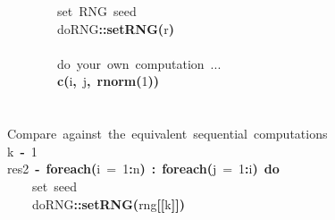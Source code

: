 \documentclass[a4paper,12pt]{article}\usepackage{graphicx, color}
\makeatletter
\newcommand{\hlnumber}[1]{\textcolor[rgb]{0,0,0}{#1}}%
\newcommand{\hlfunctioncall}[1]{\textcolor[rgb]{0.501960784313725,0,0.329411764705882}{\textbf{#1}}}%
\newcommand{\hlkeyword}[1]{\textcolor[rgb]{0,0,0}{\textbf{#1}}}%
\newcommand{\hlargument}[1]{\textcolor[rgb]{0.690196078431373,0.250980392156863,0.0196078431372549}{#1}}%
\newcommand{\hlcomment}[1]{\textcolor[rgb]{0.180392156862745,0.6,0.341176470588235}{#1}}%
\newcommand{\hlassignement}[1]{\textcolor[rgb]{0,0,0}{\textbf{#1}}}%
\newcommand{\hlpackage}[1]{\textcolor[rgb]{0.588235294117647,0.709803921568627,0.145098039215686}{#1}}%
\newcommand{\hlsymbol}[1]{\textcolor[rgb]{0,0,0}{#1}}%
\newcommand{\hlstd}[1]{\textcolor[rgb]{0,0,0}{#1}}%
\newenvironment{kframe}{%
 \def\FrameCommand##1{\hskip\@totalleftmargin \hskip-\fboxsep
 \colorbox{shadecolor}{##1}\hskip-\fboxsep
     \hskip-\linewidth \hskip-\@totalleftmargin \hskip\columnwidth}%
 \MakeFramed {\advance\hsize-\width
   \@totalleftmargin\z@ \linewidth\hsize
   \@setminipage}}%
 {\par\unskip\endMakeFramed}
\newenvironment{knitrout}{}{} %
\renewenvironment{knitrout}{\begin{footnotesize}}{\end{footnotesize}}
\makeatother
\begin{document}
\begin{knitrout}
\begin{kframe}
\begin{flushleft}
\hlstd{}{\ }{\ }{\ }{\ }{\ }{\ }{\ }{\ }\hlcomment{\usebox{\hlnormalsizeboxhash}{\ }set{\ }RNG{\ }seed}\hspace*{\fill}\\
\hlstd{}{\ }{\ }{\ }{\ }{\ }{\ }{\ }{\ }\hlpackage{doRNG}\hlkeyword{::}\hlfunctioncall{setRNG}\hlkeyword{(}\hlsymbol{r}\hlkeyword{)}\hspace*{\fill}\\
\hlstd{}\hspace*{\fill}\\
\hlstd{}{\ }{\ }{\ }{\ }{\ }{\ }{\ }{\ }\hlcomment{\usebox{\hlnormalsizeboxhash}{\ }do{\ }your{\ }own{\ }computation{\ }...}\hspace*{\fill}\\
\hlstd{}{\ }{\ }{\ }{\ }{\ }{\ }{\ }{\ }\hlfunctioncall{c}\hlkeyword{(}\hlsymbol{i}\hlkeyword{,}{\ }\hlsymbol{j}\hlkeyword{,}{\ }\hlfunctioncall{rnorm}\hlkeyword{(}\hlnumber{1}\hlkeyword{)}\hlkeyword{)}\hspace*{\fill}\\
\hlstd{}{\ }{\ }{\ }{\ }\hlkeyword{\usebox{\hlnormalsizeboxclosebrace}}\hspace*{\fill}\\
\hlstd{}\hspace*{\fill}\\
\hlstd{}\hlcomment{\usebox{\hlnormalsizeboxhash}{\ }Compare{\ }against{\ }the{\ }equivalent{\ }sequential{\ }computations}\hspace*{\fill}\\
\hlstd{}\hlsymbol{k}{\ }\hlassignement{\usebox{\hlnormalsizeboxlessthan}-}{\ }\hlnumber{1}\hspace*{\fill}\\
\hlstd{}\hlsymbol{res2}{\ }\hlassignement{\usebox{\hlnormalsizeboxlessthan}-}{\ }\hlfunctioncall{foreach}\hlkeyword{(}\hlargument{i}{\ }\hlargument{=}{\ }\hlnumber{1}\hlkeyword{:}\hlsymbol{n}\hlkeyword{)}{\ }\hlkeyword{\usebox{\hlnormalsizeboxpercent}:\usebox{\hlnormalsizeboxpercent}}{\ }\hlfunctioncall{foreach}\hlkeyword{(}\hlargument{j}{\ }\hlargument{=}{\ }\hlnumber{1}\hlkeyword{:}\hlsymbol{i}\hlkeyword{)}{\ }\hlkeyword{\usebox{\hlnormalsizeboxpercent}do\usebox{\hlnormalsizeboxpercent}}{\ }\hlkeyword{\usebox{\hlnormalsizeboxopenbrace}}\hspace*{\fill}\\
\hlstd{}{\ }{\ }{\ }{\ }\hlcomment{\usebox{\hlnormalsizeboxhash}{\ }set{\ }seed}\hspace*{\fill}\\
\hlstd{}{\ }{\ }{\ }{\ }\hlpackage{doRNG}\hlkeyword{::}\hlfunctioncall{setRNG}\hlkeyword{(}\hlsymbol{rng}\hlkeyword{[[}\hlsymbol{k}\hlkeyword{]}\hlkeyword{]}\hlkeyword{)}\hspace*{\fill}\\

\end{flushleft}
\end{kframe}
\end{knitrout}
\end{document}
